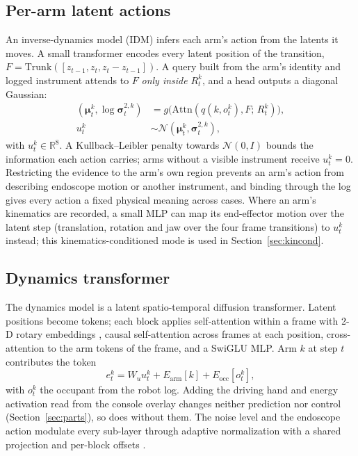\subsection{Per-arm latent actions}
An inverse-dynamics model (IDM) infers each arm's action from the latents it moves. A small transformer encodes every latent position of the transition, $F=\mathrm{Trunk}([z_{t-1},z_t,z_t-z_{t-1}])$. A query built from the arm's identity and logged instrument attends to $F$ \emph{only inside} $R^k_t$, and a head outputs a diagonal Gaussian:
\begin{equation}
\begin{split}
(\boldsymbol\mu^k_t,\log\boldsymbol\sigma^{2,k}_t)&=g\big(\mathrm{Attn}(q(k,o^k_t),F;\,R^k_t)\big),\\
u^k_t&\sim\mathcal{N}(\boldsymbol\mu^k_t,\boldsymbol\sigma^{2,k}_t),
\end{split}
\end{equation}
with $u^k_t\in\mathbb{R}^{8}$. A Kullback--Leibler penalty towards $\mathcal{N}(0,I)$ bounds the information each action carries; arms without a visible instrument receive $u^k_t=0$. Restricting the evidence to the arm's own region prevents an arm's action from describing endoscope motion or another instrument, and binding through the log gives every action a fixed physical meaning across cases. Where an arm's kinematics are recorded, a small MLP can map its end-effector motion over the latent step (translation, rotation and jaw over the four frame transitions) to $u^k_t$ instead; this kinematics-conditioned mode is used in Section~\ref{sec:kincond}.

\subsection{Dynamics transformer}
The dynamics model is a latent spatio-temporal diffusion transformer. Latent positions become tokens; each block applies self-attention within a frame with 2-D rotary embeddings \cite{rope}, causal self-attention across frames at each position, cross-attention to the arm tokens of the frame, and a SwiGLU MLP. Arm $k$ at step $t$ contributes the token
\begin{equation}
e^k_t=W_u u^k_t+E_{\mathrm{arm}}[k]+E_{\mathrm{occ}}[o^k_t],
\end{equation}
with $o^k_t$ the occupant from the robot log. Adding the driving hand and energy activation read from the console overlay changes neither prediction nor control (Section~\ref{sec:parts}), so \method{} does without them. The noise level and the endoscope action modulate every sub-layer through adaptive normalization with a shared projection and per-block offsets \cite{pixartalpha}.

